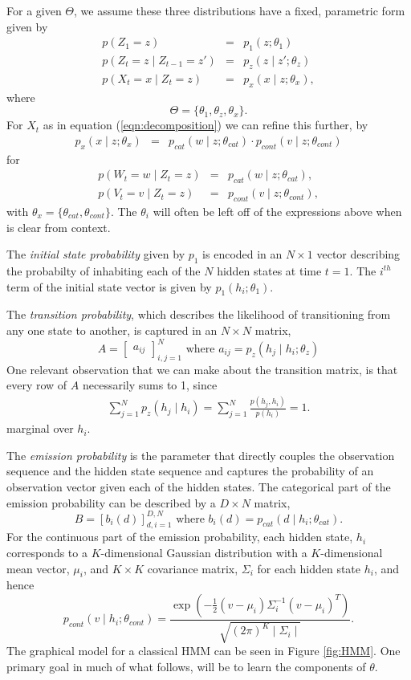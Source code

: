 \documentclass{amsart}
\begin{document}
For a given $\Theta$, we assume 
these three distributions have a fixed, parametric form given by 
\begin{eqnarray*}
p(Z_1=z) &=& p_1(z;\theta_1)\\
p(Z_t = z\mid Z_{t-1}=z') & = & p_z(z\mid z';\theta_z)\\
p(X_t=x\mid Z_t=z) & = &p_x(x\mid z;\theta_x),
\end{eqnarray*} 
where 
\[
\Theta = \{\theta_1,\theta_z,\theta_x\}.
\]
For $X_t$ as in equation (\ref{eqn:decomposition}) we can refine this further, 
by
\begin{eqnarray*}
p_x(x\mid z;\theta_x)& = &p_{cat}(w\mid z; \theta_{cat})\cdot p_{cont}(v\mid z; \theta_{cont})
\end{eqnarray*}
for
\begin{eqnarray*}
p(W_t=w\mid Z_t=z) & = & p_{cat}(w\mid z; \theta_{cat}),\\
p(V_t=v\mid Z_t=z) & = & p_{cont}(v\mid z; \theta_{cont}),
\end{eqnarray*}
with $\theta_x = \{\theta_{cat},\theta_{cont}\}$.
The $\theta_i$ will often be left off of the expressions above when is clear 
from context. 

The {\em initial state probability} given by $p_1$ is encoded in an $N\times 1$ 
vector describing the probabilty of inhabiting each of the $N$ hidden states at 
time $t=1$.  The $i^{th}$ term of the initial state vector is given by  
$p_1(h_i; \theta_1)$. 

The {\em transition probability}, which describes the 
likelihood of transitioning from any one state to another, is captured in an 
$N\times N$ matrix, 
\[
A=\begin{bmatrix}
a_{ij}
\end{bmatrix}_{i,j=1}^N \text{ where }a_{ij} = p_z(h_j\mid h_i;\theta_z)
\]
One relevant observation that we can make about the transition matrix, is that 
every row of $A$ necessarily sums to 1, since 
\begin{eqnarray}\label{eqn:transitionsum}
\sum_{j=1}^Np_z(h_j\mid h_i)=\sum_{j=1}^N\frac{p(h_j,h_i)}{p(h_i)}=1.
\end{eqnarray}
marginal over $h_i$.

The {\em emission probability} is the parameter that directly 
couples the observation sequence and the hidden 
state sequence and captures the probability of an observation vector given each 
of the hidden states. The categorical part of the emission probability can be 
described by a $D\times N$ matrix, 
\[
B = \left[b_{i}(d)\right]_{d,i=1}^{D,N}\text{ where }b_{i}(d) =p_{cat}(d\mid h_i; \theta_{cat}).
\]
For the continuous part of the emission probability, each hidden state, $h_i$ 
corresponds to a $K$-dimensional Gaussian distribution with a 
$K$-dimensional mean vector, $\mu_i$, 
and $K\times K$ covariance matrix, $\Sigma_i$ for each hidden state $h_i$, and 
hence 
\[
p_{cont}(v\mid 
h_i;\theta_{cont})=\frac{\exp\left(-\frac{1}{2}\left(v-\mu_i\right)\Sigma_i^{-1}\left(v-\mu_i\right)^T\right)}{\sqrt{(2\pi)^K\mid \Sigma_i\mid}}.
\]
The graphical model for a classical HMM can 
be seen in Figure \ref{fig:HMM}.  One primary goal in much of what follows, will be to learn the components of 
$\theta$.
\end{document}
